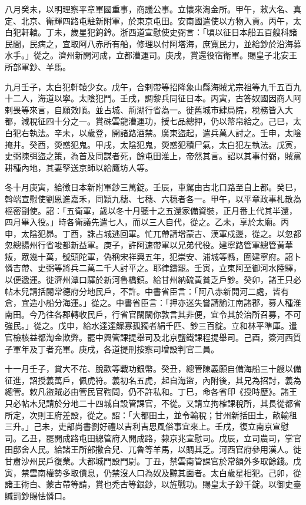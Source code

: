 \begin{pinyinscope}
 八月癸未，以明理察平章軍國重事，商議公事。立懷來淘金所。甲午，敕大名、真定、北京、衛輝四路屯駐新附軍，於東京屯田。安南國遣使以方物入貢。丙午，太白犯軒轅。丁未，歲星犯鉤鈐。浙西道宣慰使史弼言：「頃以征日本船五百艘科諸民間，民病之，宜取阿八赤所有船，修理以付阿塔海，庶寬民力，並給鈔於沿海募水手。」從之。濟州新開河成，立都漕運司。庚戌，賞還役宿衛軍。賜皇子北安王所部軍鈔、羊馬。



 九月壬子，太白犯軒轅少女。戊午，合剌帶等招降象山縣海賊尤宗祖等九千五百九十二人，海道以寧。太陰犯鬥。壬戌，調黎兵同征日本。丙寅，古答奴國因商人阿剌畏等來言，自願效順。並占城、荊湖行省為一。徙舊城市肆局院，稅務皆入大都，減稅征四十分之一。賞硃雲龍漕運功，授七品總押，仍以幣帛給之。己巳，太白犯右執法。辛未，以歲登，開諸路酒禁。廣東盜起，遣兵萬人討之。壬申，太陰掩井。癸酉，熒惑犯鬼。甲戌，太陰犯鬼，熒惑犯積尸氣，太白犯左執法。戊寅，史弼陳弭盜之策，為首及同謀者死，餘屯田淮上，帝然其言。詔以其事付弼，賊黨耕種內地，其妻孥送京師以給鷹坊人等。



 冬十月庚寅，給徵日本新附軍鈔三萬錠。壬辰，車駕由古北口路至自上都。癸巳，斡端宣慰使劉恩進嘉禾，同穎九穗、七穗、六穗者各一。甲午，以平章政事札散為樞密副使。詔：「五衛軍，歲以冬十月聽十之五還家備資裝，正月番上代其半還，四月畢入役。」時各衛議先遣七人，而以三人自代，從之。乙未，享於太廟。丙申，太陰犯昴。丁酉，誅占城逃回軍。忙兀帶請增蒙古、漢軍戍邊，從之。以忽都忽總揚州行省唆都新益軍。庚子，許阿速帶軍以兄弟代役。建寧路管軍總管黃華叛，眾幾十萬，號頭陀軍，偽稱宋祥興五年，犯崇安、浦城等縣，圍建寧府。詔卜憐吉帶、史弼等將兵二萬二千人討平之。耶律鑄罷。壬寅，立東阿至御河水陸驛，以便遞運。徙濟州潭口驛於新河魯橋鎮。給甘州納硫黃貧乏戶鈔。癸卯，諸王只必帖木兒請括閱常德府分地民戶，不許。中書省臣言：「阿八赤新開河二處，皆有倉，宜造小船分海運。」從之。中書省臣言：「押亦迷失嘗請諭江南諸郡，募人種淮南田。今乃往各郡轉收民戶，行省官闊闊你敦言其非便，宜令其於治所召募，不可強民。」從之。戊申，給水達達鰥寡孤獨者絹千匹、鈔三百錠。立和林平準庫。遣官檢核益都淘金欺弊。罷中興管課提舉司及北京鹽鐵課程提舉司。己酉，簽河西質子軍年及丁者充軍。庚戌，各道提刑按察司增設判官二員。



 十一月壬子，賞大不花、脫歡等戰功銀幣。癸丑，總管陳義願自備海船三十艘以備征進，詔授義萬戶，佩虎符。義初名五虎，起自海盜，內附後，其兄為招討，義為總管。敕凡盜賊必由管民官鞫問，仍不許私和。丁巳，命各省印《授時歷》。諸王只必帖木兒請於分地二十四城自設管課官，不從。又請立拘榷課稅所，其長從都省所定，次則王府差設，從之。詔：「大都田土，並令輸稅；甘州新括田土，畝輸租三升。」己未，吏部尚書劉好禮以吉利吉思風俗事宜來上。壬戌，復立南京宣慰司。乙丑，罷開成路屯田總管府入開成路，隸京兆宣慰司。戊辰，立司農司，掌官田邸舍人民。給諸王所部撒合兒、兀魯等羊馬，以賙其乏。河西官府參用漢人。徙甘肅沙州民戶復業。大都城門設門尉。丁丑，禁雲南管課官於常額外多取餘錢。戊寅，禁雲南權勢多取債息，仍禁沒人口為奴及黥其面者。太白歲星相犯。己卯，從諸王術白、蒙古帶等請，賞也禿古等銀鈔，以旌戰功。賜皇太子鈔千錠。以御史臺贓罰鈔賜怯憐口。




\end{pinyinscope}
